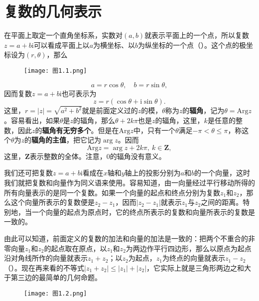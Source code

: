 \documentclass[../../main.tex]{subfiles}
\begin{document}
\section{复数的几何表示}\label{section:复数的几何表示}

在平面上取定一个直角坐标系，实数对\((a,b)\)就表示平面上的一个点，所以复数\(z = a + b\mathrm{i}\)可以看成平面上以\(a\)为横坐标、以\(b\)为纵坐标的一个点（）。这个点的极坐标设为\((r,\theta)\)，那么
\begin{figure}[H]
\centering
\texttt{[image: 图1.1.png]}
\caption{}
\label{figure:图1.1}
\end{figure}
\[
a = r\cos\theta, \quad b = r\sin\theta,
\]
因而复数\(z = a + b\mathrm{i}\)也可表示为
\[
z = r(\cos\theta + \mathrm{i}\sin\theta).
\]
这里，\(r = |z| = \sqrt{a^2 + b^2}\)就是前面定义过的\(z\)的模，\(\theta\)称为\(z\)的\textbf{辐角}，记为\(\theta = \mathrm{Arg}z\)。容易看出，如果\(\theta\)是\(z\)的辐角，那么\(\theta + 2k\pi\)也是\(z\)的辐角，这里，\(k\)是任意的整数，因此\(z\)的\textbf{辐角有无穷多个}。但是在\(\mathrm{Arg}z\)中，只有一个\(\theta\)满足\(-\pi < \theta \leqslant \pi\)，称这个\(\theta\)为\(z\)的\textbf{辐角的主值}，把它记为\(\arg z\)。因而
\[
\mathrm{Arg}z = \arg z + 2k\pi, \ k \in \mathbf{Z},
\]
这里，\(\mathbf{Z}\)表示整数的全体。注意，\(0\)的辐角没有意义。

我们还可把复数\(z = a + b\mathrm{i}\)看成在\(x\)轴和\(y\)轴上的投影分别为\(a\)和\(b\)的一个向量，这时我们就把复数和向量作为同义语来使用。容易知道，由一向量经过平行移动所得的所有向量表示的是同一个复数。如果一个向量的起点和终点分别为复数\(z_1\)和\(z_2\)，那么这个向量所表示的复数便是\(z_2 - z_1\)，因而\(|z_2 - z_1|\)就表示\(z_1\)与\(z_2\)之间的距离。特别地，当一个向量的起点为原点时，它的终点所表示的复数和向量所表示的复数是一致的。

由此可以知道，前面定义的复数的加法和向量的加法是一致的：把两个不重合的非零向量\(z_1\)和\(z_2\)的起点取在原点，以\(z_1\)和\(z_2\)为两边作平行四边形，那么以原点为起点沿对角线所作的向量就表示\(z_1 + z_2\)；以\(z_2\)为起点，\(z_1\)为终点的向量就表示\(z_1 - z_2\)（）。现在再来看的不等式\(|z_1 + z_2| \leqslant |z_1| + |z_2|\)，它实际上就是三角形两边之和大于第三边的最简单的几何命题。
\begin{figure}[H]
\centering
\texttt{[image: 图1.2.png]}
\caption{}
\label{figure:图1.2}
\end{figure}
\end{document}
